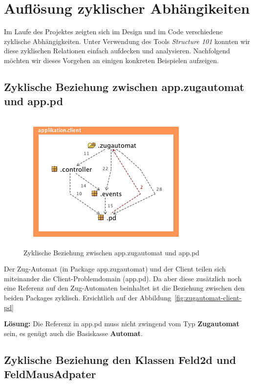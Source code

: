 \documentclass[12pt,halfparskip]{scrartcl}
\begin{document}

\section{Auflösung zyklischer Abhängikeiten}
Im Laufe des Projektes zeigten sich im Design und im Code verschiedene zyklische Abhängigkeiten. Unter Verwendung des Tools \emph{Structure 101} konnten wir diese zyklischen Relationen einfach aufdecken und analysieren. Nachfolgend möchten wir dieses Vorgehen an einigen konkreten Beispielen aufzeigen.

\subsection{Zyklische Beziehung zwischen app.zugautomat und app.pd}

\begin{figure}[h]
	\centering
	\includegraphics[width=0.5 \textwidth]{../design/probleme/zugautomat-client-pd}
	\caption{Zyklische Beziehung zwischen app.zugautomat und app.pd}
	\label{fig:zugautomat-client-pd}
\end{figure}

Der Zug-Automat (in Package app.zugautomat) und der Client teilen sich miteinander die Client-Problemdomain (app.pd). Da aber diese zusätzlich noch eine Referenz auf den Zug-Automaten beinhaltet ist die Beziehung zwischen den beiden Packages zyklisch. Ersichtlich auf der Abbildung~\vref{fig:zugautomat-client-pd}

\textbf{Lösung:} Die Referenz in app.pd muss nicht zwingend vom Typ \textbf{Zugautomat} sein, es genügt auch die Basiskasse \textbf{Automat}.

\subsection{Zyklische Beziehung den Klassen Feld2d und FeldMausAdpater}
\end{document}
